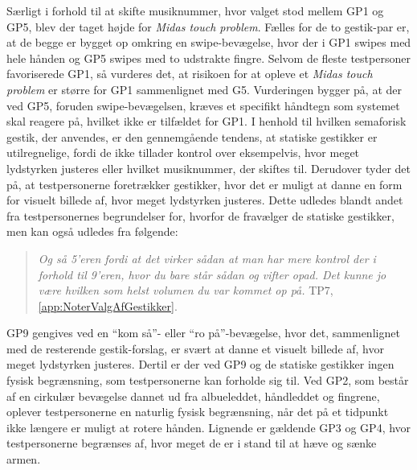 Særligt i forhold til at skifte musiknummer, hvor valget stod mellem GP1 og GP5, blev der taget højde for \textit{Midas touch problem}. Fælles for de to gestik-par er, at de begge er bygget op omkring en swipe-bevægelse, hvor der i GP1 swipes med hele hånden og GP5 swipes med to udstrakte fingre. Selvom de fleste testpersoner favoriserede GP1, så vurderes det, at risikoen for at opleve et \textit{Midas touch problem} er større for GP1 sammenlignet med G5. Vurderingen bygger på, at der ved GP5, foruden swipe-bevægelsen, kræves et specifikt håndtegn som systemet skal reagere på, hvilket ikke er tilfældet for GP1.\blankline
%
I henhold til hvilken semaforisk gestik, der anvendes, er den gennemgående tendens, at statiske gestikker er utilregnelige, fordi de ikke tillader kontrol over eksempelvis, hvor meget lydstyrken justeres eller hvilket musiknummer, der skiftes til. Derudover tyder det på, at testpersonerne foretrækker gestikker, hvor det er muligt at danne en form for visuelt billede af, hvor meget lydstyrken justeres. Dette udledes blandt andet fra testpersonernes begrundelser for, hvorfor de fravælger de statiske gestikker, men kan også udledes fra følgende:  
%
\begin{quotation}
	\noindent
	\textit{Og så 5'eren fordi at det virker sådan at man har mere kontrol der i forhold til 9'eren, hvor du bare står sådan og vifter opad. Det kunne jo være hvilken som helst volumen du var kommet op på.} TP7, \autoref{app:NoterValgAfGestikker}.
\noindent
\end{quotation}
%
GP9 gengives ved en \enquote{kom så}- eller \enquote{ro på}-bevægelse, hvor det, sammenlignet med de resterende gestik-forslag, er svært at danne et visuelt billede af, hvor meget lydstyrken justeres. Dertil er der ved GP9 og de statiske gestikker ingen fysisk begrænsning, som testpersonerne kan forholde sig til. Ved GP2, som består af en cirkulær bevægelse dannet ud fra albueleddet, håndleddet og fingrene, oplever testpersonerne en naturlig fysisk begrænsning, når det på et tidpunkt ikke længere er muligt at rotere hånden. Lignende er gældende GP3 og GP4, hvor testpersonerne begrænses af, hvor meget de er i stand til at hæve og sænke armen.

